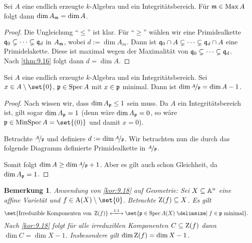 \documentclass[12pt,a4paper]{scrartcl}
\theoremstyle{cplain}
\theoremstyle{cdef}
\newtheorem{beme}[thmcounter]{Bemerkung}
\begin{document}
\begin{kor}
	Sei $A$ eine endlich erzeugte $k$-Algebra und ein Integritätsbereich. Für $\mathfrak{m}\in\operatorname{Max} A$ folgt dann $\dim A_{\mathfrak{m}} = \dim A$. 
\end{kor}
\begin{proof}
	Die Ungleichung \enquote{$\le$} ist klar. Für \enquote{$\ge$} wählen wir eine Primidealkette $\mathfrak{q}_0\subsetneq\dots\subsetneq \mathfrak{q}_d$ in $A_{\mathfrak{m}}$, wobei $d := \dim A_m$. Dann ist $\mathfrak{q}_0\cap A\subsetneq \dots \subsetneq \mathfrak{q}_d\cap A$ eine Primidelakette. Diese ist maximal wegen der Maximalität von $\mathfrak{q}_0\subsetneq \dots \subsetneq \mathfrak{q}_d$. Nach \cref{thm:9.16} folgt dann $d = \dim A$.
\end{proof}
\begin{kor} \label{kor:9.18}
	Sei $A$ eine endlich erzeugte $k$-Algebra und ein Integritätsbereich. Sei $x\in A\setminus \set{0}$, $\mathfrak{p}\in \operatorname{Spec} A$ mit $x\in \mathfrak{p}$ minimal. Dann ist $\dim \nicefrac{A}{\mathfrak{p}} =\dim A-1$. 
\end{kor}
\begin{proof}
	Nach  wissen wir, dass $\dim A_{\mathfrak{p}}\le 1$ sein muss. Da $A$ ein Integritätsbereich ist, gilt sogar $\dim A_{\mathfrak{p}}  = 1$ (denn wäre $\dim A_{\mathfrak{p}} = 0$, so wäre $\fp\in\MinSpec A = \set{(0)}$ und damit $x = 0$).
	
	Betrachte $\nicefrac{A}{\mathfrak{p}}$ und definiere $d := \dim \nicefrac{A}{\mathfrak{p}}$. Wir betrachten nun die durch das folgende Diagramm definierte Primidealkette in $\nicefrac{A}{\mathfrak{p}}$.
	\begin{center}
	\end{center}
	Somit folgt $\dim A \ge \dim \nicefrac{A}{\mathfrak{p}}+1$. Aber es gilt auch schon Gleichheit, da $\dim A_{\mathfrak{p}} = 1$.
\end{proof}

\begin{beme}
	Anwendung von \cref{kor:9.18} auf Geometrie: Sei $X\subseteq \mathbb A^n$ eine affine Varietät und $f\in \A(X)\setminus\set{0}$. Betrachte $\operatorname{Z}(f)\subseteq X$. Es gilt
	\[\set{\text{Irreduzible Komponenten von }\Z(f)} \xlongleftrightarrow{1:1} \set{\fp\in\Spec A(X)\given f\in\fp\text{ minimal}}.\]
	Nach \cref{kor:9.18} folgt für alle irreduziblen Komponenten $C\subseteq \operatorname{Z}(f)$ dann $\dim C = \dim X-1$. Insbesondere gilt $\dim \operatorname{Z}(f) = \dim X-1$. 
\end{beme}
\end{document}

